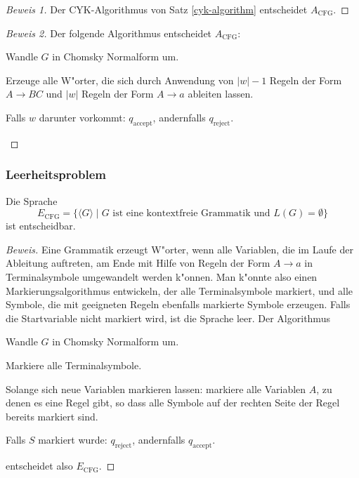 \begin{proof}[Beweis 1]
Der CYK-Algorithmus von Satz \ref{cyk-algorithm} entscheidet
$A_{\text{CFG}}$.
\end{proof}

\begin{proof}[Beweis 2]
Der folgende Algorithmus entscheidet
$A_{\text{CFG}}$:
\medskip
\begin{compactenum}
\item Wandle $G$ in Chomsky Normalform um.
\item Erzeuge alle W"orter, die sich durch Anwendung
von $|w|-1$ Regeln der Form $A\to BC$ und $|w|$ Regeln
der Form $A\to a$ ableiten lassen.
\item Falls $w$ darunter vorkommt: $q_{\text{accept}}$, 
andernfalls $q_{\text{reject}}$.
\end{compactenum}
\medskip
\end{proof}

\subsubsection{Leerheitsproblem}
%
\begin{satz}
Die Sprache
\[
E_{\text{CFG}}=\{
\langle G\rangle\;|\; \text{$G$ ist eine kontextfreie Grammatik und $L(G)=\emptyset$}
\}
\]
ist entscheidbar.
%
\end{satz}

\begin{proof}[Beweis]
Eine Grammatik erzeugt W"orter, wenn alle Variablen, die im Laufe
der Ableitung auftreten, am Ende mit Hilfe von Regeln der Form $A\to a$
in Terminalsymbole umgewandelt werden k"onnen.
Man k"onnte also einen
Markierungsalgorithmus entwickeln, der alle Terminalsymbole markiert,
und alle Symbole, die mit geeigneten Regeln ebenfalls markierte Symbole
erzeugen.
Falls die Startvariable nicht markiert wird, ist die Sprache leer.
Der Algorithmus 
\medskip
\begin{compactenum}
\item Wandle $G$ in Chomsky Normalform um.
\item Markiere alle Terminalsymbole.
\item Solange sich neue Variablen markieren lassen: markiere alle
Variablen $A$, zu denen es eine Regel gibt, so dass alle Symbole auf
der rechten Seite der Regel bereits markiert sind.
\item Falls $S$ markiert wurde: $q_{\text{reject}}$, andernfalls
$q_{\text{accept}}$.
\end{compactenum}
\medskip
entscheidet also
$E_{\text{CFG}}$.
\end{proof}

